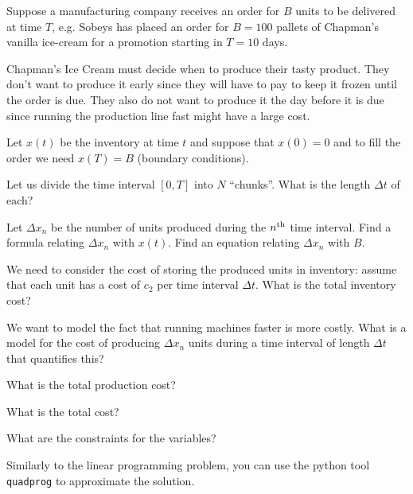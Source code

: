 \documentclass{workbook}
\begin{document}
\begin{slide}

\question

\begin{problem}

Suppose a manufacturing company receives an order for $B$ units to be delivered at time $T$, e.g. Sobeys has placed an order for $B = 100$ pallets of Chapman's vanilla ice-cream for a promotion starting in $T = 10$ days.

Chapman's Ice Cream must decide when to produce their tasty product. They don't want to produce it early since they will have to pay to keep it frozen until the order is due. They also do not want to produce it the day before it is due since running the production line fast might have a large cost. %
\end{problem}

Let $x(t)$ be the inventory at time $t$ and suppose that $x(0)=0$ and to fill the order we need $x(T)=B$ (boundary conditions).

\begin{parts}
	\item Let us divide the time interval $[0,T]$ into $N$ ``chunks''. What is the length $\Delta t$ of each?
	\item Let $\Delta x_n$ be the number of units produced during the $n^{\rm th}$ time interval. Find a formula relating $\Delta x_n$ with $x(t)$. Find an equation relating $\Delta x_n$ with $B$.
	\item We need to consider the cost of storing the produced units in inventory: assume that each unit has a cost of $c_2$ per time interval $\Delta t$. What is the total inventory cost?
	\item We want to model the fact that running machines faster is more costly. What is a model for the cost of producing $\Delta x_n$ units during a time interval of length $\Delta t$ that quantifies this?
	\item What is the total production cost? 
	\item What is the total cost?
	\item What are the constraints for the variables?
	\item Similarly to the linear programming problem, you can use the python tool \texttt{quadprog} to approximate the solution.
\end{parts}
\end{slide}
\end{document}
